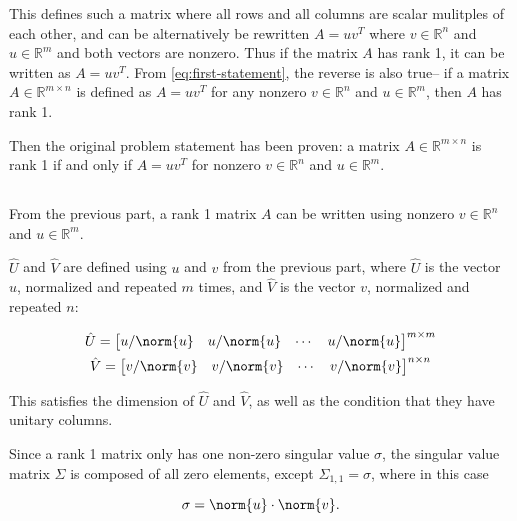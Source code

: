 \documentclass{template}
\begin{document}
This defines such a matrix where all rows and all columns are scalar mulitples of each other, and can be alternatively be rewritten $A = uv^T$ where $v \in \mathbb{R}^n$ and $u \in \mathbb{R}^m$ and both vectors are nonzero. Thus if the matrix $A$ has rank 1, it can be written as $A = uv^T$. From \autoref{eq:first-statement}, the reverse is also true-- if a matrix $A \in \mathbb{R}^{m\times n}$ is defined as $A = uv^T$ for any nonzero $v \in \mathbb{R}^n$ and $u \in \mathbb{R}^m$, then $A$ has rank 1.

Then the original problem statement has been proven: a matrix $A \in \mathbb{R}^{m\times n}$ is rank 1 if and only if $A = uv^T$ for nonzero $v \in \mathbb{R}^n$ and $u \in \mathbb{R}^m$.

\subsection{}

From the previous part, a rank 1 matrix $A$ can be written using nonzero $v \in \mathbb{R}^n$ and $u \in \mathbb{R}^m$. 


$\hat{U}$ and $\hat{V}$ are defined using $u$ and $v$ from the previous part, where $\hat{U}$ is the vector $u$, normalized and repeated $m$ times, and $\hat{V}$ is the vector $v$, normalized and repeated $n$:

\begin{equation}
  \begin{gathered}
  \hat{U}= \begin{bmatrix}
    u/\norm{u} & u/\norm{u} & \cdots & u/\norm{u}
  \end{bmatrix}^{m\times m}\\
  \hat{V} = \begin{bmatrix}
    v/\norm{v} & v/\norm{v} & \cdots & v/\norm{v}
  \end{bmatrix}^{n\times n}
  \end{gathered}
\end{equation}

This satisfies the dimension of $\hat{U}$ and $\hat{V}$, as well as the condition that they have unitary columns.

Since a rank 1 matrix only has one non-zero singular value $\sigma$, the singular value matrix $\hat{\Sigma}$ is composed of all zero elements, except $\Sigma_{1,1} = \sigma$, where in this case

\begin{equation}
  \sigma = \norm{u}\cdot \norm{v}.
\end{equation}
\end{document}
